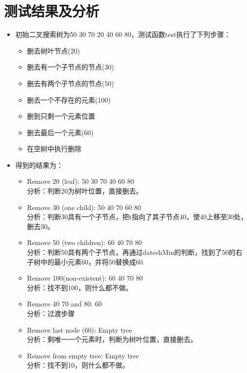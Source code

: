 \documentclass[a4paper]{article}
\begin{document}
\section*{测试结果及分析}
\begin{itemize}
    \item 初始二叉搜索树为50 30 70 20 40 60 80，测试函数test执行了下列步骤：
    \begin{itemize}
         \item 删去树叶节点(20)
         \item 删去有一个子节点的节点(30)
         \item 删去有两个子节点的节点(50)
         \item 删去一个不存在的元素(100)
         \item 删到只剩一个元素位置
         \item 删去最后一个元素(60)
         \item 在空树中执行删除
    \end{itemize}
    \item 得到的结果为：
    \begin{itemize}
        \item Remove 20 (leaf): 50 30 70 40 60 80 \\  分析：判断20为树叶位置，直接删去。
        \item Remove 30 (one child): 50 40 70 60 80 \\ 分析：判断30具有一个子节点，把t指向了其子节点40，使40上移至30处，删去30。
        \item Remove 50 (two children): 60 40 70 80 \\ 分析：判断50具有两个子节点，再通过datechMin的判断，找到了50的右子树中的最小元素60，并将50替换成60.
        \item Remove 100(non-existent): 60 40 70 80 \\ 分析：找不到100，则什么都不做。
        \item Remove 40 70 and 80: 60 \\ 分析：过渡步骤
        \item Remove last node (60): Empty tree \\ 分析：剩唯一一个元素时，判断为树叶位置，直接删去。
        \item Remove from empty tree: Empty tree \\ 分析：找不到10，则什么都不做。
    \end{itemize}
\end{itemize}
\end{document}
